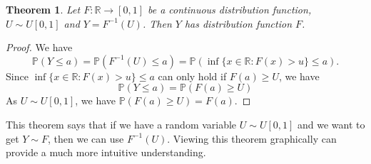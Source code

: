 \documentclass[
]{book}
\newtheorem{theorem}{Theorem}[chapter]
\theoremstyle{definition}
\theoremstyle{definition}
\theoremstyle{definition}
\theoremstyle{definition}
\theoremstyle{remark}
\begin{document}
\begin{theorem}
Let \(F :\mathbb{R} \rightarrow [0, 1]\) be a continuous distribution function, \(U \sim U[0, 1]\) and \(Y = F^{-1}(U)\). Then \(Y\) has distribution function \(F\).
\end{theorem}

\begin{proof}
We have
\[
\mathbb{P}(Y \leq a) = \mathbb{P}(F^{-1}(U) \leq a) = \mathbb{P}(\inf\{x \in\mathbb{R} : F(x) > u\} \leq a). 
\]
Since \(\inf\{x \in\mathbb{R} : F(x) > u\} \leq a\) can only hold if \(F(a) \geq U\), we have
\[
\mathbb{P}(Y \leq a)  = \mathbb{P}(F(a)\geq U)
\]
As \(U \sim U[0, 1]\), we have \(\mathbb{P}(F(a)\geq U) = F(a)\).
\end{proof}

This theorem says that if we have a random variable \(U \sim U[0, 1]\) and we want to get \(Y \sim F\), then we can use \(F^{-1}(U)\). Viewing this theorem graphically can provide a much more intuitive understanding.
\end{document}

